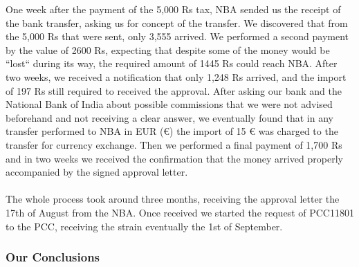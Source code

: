 \begin{formal}
One week after the payment of the 5,000 Rs tax, NBA sended us the receipt of the bank transfer, asking us for concept of the transfer. We discovered that from the 5,000 Rs that were sent, only 3,555 arrived. We performed a second payment by the value of 2600 Rs, expecting that despite some of the money would be “lost“ during its way, the required amount of 1445 Rs could reach NBA. After two weeks, we received a notification that only 1,248 Rs arrived, and the import of 197 Rs still required to received the approval. After asking our bank and the National Bank of India about possible commissions that we were not advised beforehand and not receiving a clear answer, we eventually found that in any transfer performed to NBA in EUR (€) the import of 15 € was charged to the transfer for currency exchange. Then we performed a final payment of 1,700 Rs and in two weeks we received the confirmation that the money arrived properly accompanied by the signed approval letter. \\ \\
The whole process took around three months, receiving the approval letter the 17th of August from the NBA. Once received we started the request of PCC11801 to the PCC, receiving the strain eventually the 1st of September. 
\end{formal}

\subsubsection{Our Conclusions}

